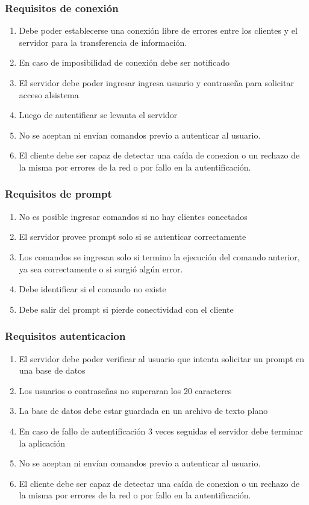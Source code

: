 \documentclass[fontsize=12pt]{article}
\begin{document}
\subsubsection{\textbf{Requisitos de conexión}}
\begin{enumerate}
\item Debe poder establecerse una conexión libre de errores entre los clientes y el servidor para la transferencia de información.
\item En caso de imposibilidad de conexión debe ser notificado
\item El servidor debe poder ingresar ingresa usuario y contraseña para solicitar acceso alsistema
\item Luego de autentificar se levanta el servidor
\item No se aceptan ni envían comandos previo a autenticar al usuario.
\item El cliente debe ser capaz de detectar una caída de conexion o un rechazo de la misma por errores de la red o por fallo en la autentificación.
\end{enumerate}

\subsubsection{\textbf{Requisitos de prompt}}
\begin{enumerate}
\item No es posible ingresar comandos si no hay clientes conectados
\item El servidor provee prompt solo si se autenticar correctamente
\item Los comandos se ingresan solo si termino la ejecución del comando anterior, ya sea correctamente o si surgió algún error.
\item Debe identificar si el comando no existe
\item Debe salir del prompt si pierde conectividad con el cliente
\end{enumerate}

\subsubsection{\textbf{Requisitos autenticacion}}
\begin{enumerate}
\item El servidor debe poder verificar al usuario que intenta solicitar un prompt en una base de datos
\item Los usuarios o contraseñas no superaran los 20 caracteres
\item La base de datos debe estar guardada en un archivo de texto plano
\item En caso de fallo de autentificación 3 veces seguidas el servidor debe terminar la aplicación
\item No se aceptan ni envían comandos previo a autenticar al usuario.
\item El cliente debe ser capaz de detectar una caída de conexion o un rechazo de la misma por errores de la red o por fallo en la autentificación.
\end{enumerate}
\end{document}
